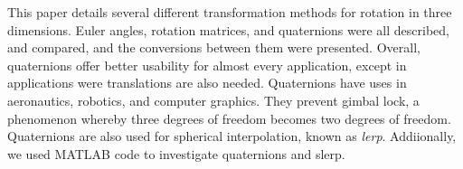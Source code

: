 This paper details several different transformation methods for rotation in three dimensions.
Euler angles, rotation matrices, and quaternions were all described, and compared, and the conversions between them were presented.
Overall, quaternions offer better usability for almost every application, except in applications were translations are also needed.
Quaternions have uses in aeronautics, robotics, and computer graphics.
They prevent gimbal lock, a phenomenon whereby three degrees of freedom becomes two degrees of freedom.
Quaternions are also used for spherical interpolation, known as \textit{lerp}.
Addiionally, we used MATLAB code to investigate quaternions and slerp.
